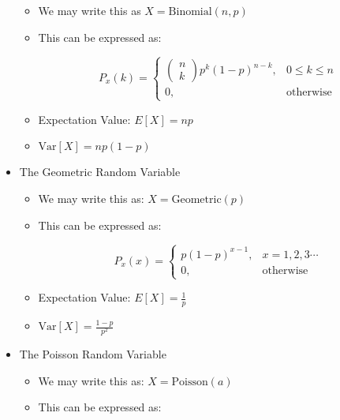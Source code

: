 \begin{itemize}
    \begin{itemize}

      \item We may write this as $X=\text{Binomial}(n,p)$

      \item This can be expressed as:

        $$P_x(k)=\left\{ \begin{array}{ll} \left( \begin{matrix} n\\k\end{matrix} \right)p^k(1-p)^{n-k},&0\leq k\leq n\\0,&\text{otherwise}\end{array}$$

        \item Expectation Value: $E[X]=np$

        \item $\text{Var}[X]=np(1-p)$

    \end{itemize}

  \item The Geometric Random Variable

    \begin{itemize}

      \item We may write this as: $X=\text{Geometric}(p)$

      \item This can be expressed as:

        $$P_x(x)=\left\{ \begin{array}{ll} p(1-p)^{x-1},&x=1,2,3\cdots\\0,&\text{otherwise}\end{array}$$

        \item Expectation Value: $E[X]=\frac{1}{p}$

        \item $\text{Var}[X]=\frac{1-p}{p^2}$

    \end{itemize}

  \item The Poisson Random Variable

    \begin{itemize}

      \item We may write this as: $X=\text{Poisson}(a)$

      \item This can be expressed as:


\end{itemize}
\end{itemize}
